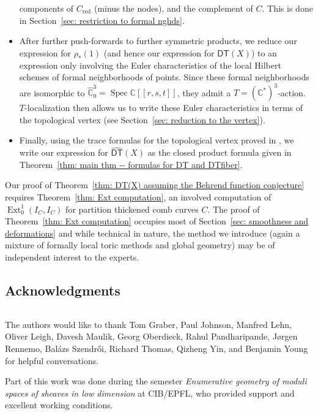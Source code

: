 \documentclass[12pt]{amsart}
\theoremstyle{definition}
\newcommand{\CC} {\mathbb{C}}          %
\newcommand{\Ext}{\operatorname{Ext}}
\newcommand{\DT}{\mathsf{DT}}
\newcommand{\Spec}{\operatorname{Spec}}
\renewcommand{\hat}{\widehat}
\newcommand{\DThat}{\widehat{\DT}}
\newcommand{\red}{\mathrm{red}}
\newcommand{\SubSecSpace}{$\,$\vspace{0.2cm}\par } %
\begin{document}
\begin{itemize}
components of $C_{\red}$ (minus the nodes), and the complement of
$C$. This is done in Section~\ref{sec: restriction
to formal nghds}. 
\item After further push-forwards to further symmetric products, we
reduce our expression for $\rho_{*}(1)$ (and hence our expression for
$\DThat (X)$) to an expression only involving the Euler
characteristics of the local Hilbert schemes of formal neighborhoods
of points. Since these formal neighborhoods are isomorphic to
$\hat{\CC}^{3}_{0}=\Spec \CC [[r,s,t]]$, they admit a $T=\left(\CC^{*}
\right)^{3}$-action. $T$-localization then allows us to write these
Euler characteristics in terms of the topological vertex (see
Section~\ref{sec: reduction to the vertex}). 
\item Finally, using the trace formulas for the topological vertex
proved in \cite{Bryan-Kool-Young}, we write our expression for
$\DThat (X)$ as the closed product formula given in Theorem~\ref{thm:
main thm -- formulas for DT and DTfiber}. 
\end{itemize}

Our proof of Theorem~\ref{thm: DT(X) assuming the Behrend
function conjecture} requires Theorem~\ref{thm: Ext computation}, an
involved computation of $\Ext^{1}_{0}(I_{C},I_{C})$ for partition
thickened comb curves $C$. The proof of Theorem~\ref{thm: Ext
computation} occupies most of Section~\ref{sec: smoothness and
deformations} and while technical in nature, the method we introduce
(again a mixture of formally local toric methods and global geometry)
may be of independent interest to the experts.

\subsection{Acknowledgments}
\SubSecSpace

The authors would like to thank Tom
Graber, Paul Johnson, Manfred Lehn, Oliver Leigh, Davesh Maulik, Georg
Oberdieck, Rahul Pandharipande, J{\o}rgen Rennemo, Bal\'azs
Szendr\H{o}i, Richard Thomas, Qizheng Yin, and Benjamin Young for
helpful conversations.

Part of this work was done during the semester \emph{Enumerative geometry 
of moduli spaces of sheaves in low dimension} at CIB/EPFL, who 
provided support and excellent working conditions.


\end{document}
